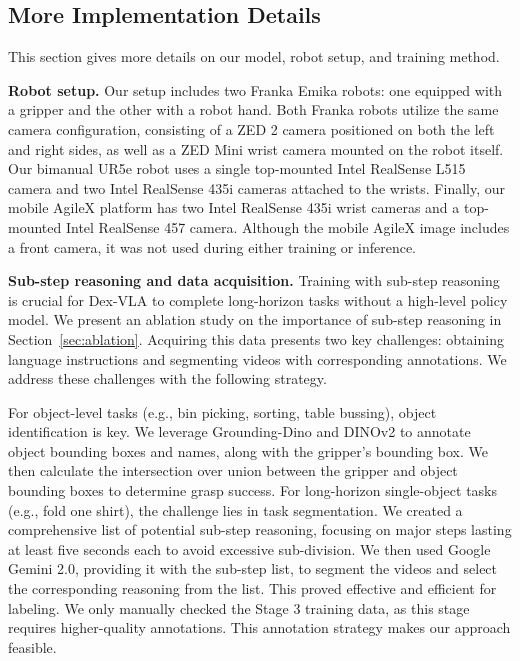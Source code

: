 \begin{appendix}
\subsection{More Implementation Details}
This section gives more details on our model, robot setup, and training method. 

\textbf{Robot setup.} Our setup includes two Franka Emika robots: one equipped with a gripper and the other with a robot hand.  Both Franka robots utilize the same camera configuration, consisting of a ZED 2 camera positioned on both the left and right sides, as well as a ZED Mini wrist camera mounted on the robot itself.  Our bimanual UR5e robot uses a single top-mounted Intel RealSense L515 camera and two Intel RealSense 435i cameras attached to the wrists.  Finally, our mobile AgileX platform has two Intel RealSense 435i wrist cameras and a top-mounted Intel RealSense 457 camera.  Although the mobile AgileX image includes a front camera, it was not used during either training or inference.

\textbf{Sub-step reasoning and data acquisition.}
Training with sub-step reasoning is crucial for Dex-VLA to complete long-horizon tasks without a high-level policy model. We present an ablation study on the importance of sub-step reasoning in Section~\ref{sec:ablation}. Acquiring this data presents two key challenges: obtaining language instructions and segmenting videos with corresponding annotations. We address these challenges with the following strategy.

For object-level tasks (e.g., bin picking, sorting, table bussing), object identification is key. We leverage Grounding-Dino and DINOv2 to annotate object bounding boxes and names, along with the gripper's bounding box.  We then calculate the intersection over union between the gripper and object bounding boxes to determine grasp success. For long-horizon single-object tasks (e.g., fold one shirt), the challenge lies in task segmentation. We created a comprehensive list of potential sub-step reasoning, focusing on major steps lasting at least five seconds each to avoid excessive sub-division. We then used Google Gemini 2.0, providing it with the sub-step list, to segment the videos and select the corresponding reasoning from the list. This proved effective and efficient for labeling.  We only manually checked the Stage 3 training data, as this stage requires higher-quality annotations. This annotation strategy makes our approach feasible.


\end{appendix}
